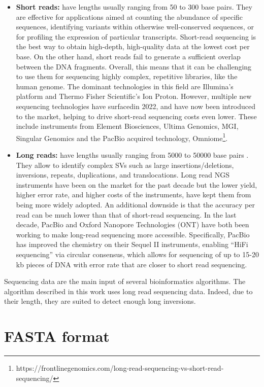 \begin{itemize}
\item \textbf{Short reads: } have lengths usually ranging from 50 to 300 base pairs. They are effective for applications aimed at counting the abundance of specific sequences, identifying variants within otherwise well-conserved sequences, or for profiling the expression of particular transcripts. Short-read sequencing is the best way to obtain high-depth, high-quality data at the lowest cost per base. On the other hand, short reads fail to generate a sufficient overlap between the DNA fragments. Overall, this means that it can be challenging to use them for sequencing highly complex, repetitive libraries, like the human genome. The dominant technologies in this field are Illumina’s platform and Thermo Fisher Scientific’s Ion Proton. However, multiple new sequencing technologies have surfacedin 2022, and have now been introduced to the market, helping to drive short-read sequencing costs even lower. These include instruments from Element Biosciences, Ultima Genomics, MGI, Singular Genomics and the PacBio acquired technology, Omniome\footnote{https://frontlinegenomics.com/long-read-sequencing-vs-short-read-sequencing/}. 
\item \textbf{Long reads: } have lengths usually ranging from 5000 to 50000 base pairs \cite{lee_error_2014}. They allow to identify complex SVs such as large insertions/deletions, inversions, repeats, duplications, and translocations. Long read NGS instruments have been on the market for the past decade but the lower yield, higher error rate, and higher costs of the instruments, have kept them from being more widely adopted. An additional downside is that the accuracy per read can be much lower than that of short-read sequencing. In the last decade, PacBio and Oxford Nanopore Technologies (ONT) have both been working to make long-read sequencing more accessible. Specifically, PacBio has improved the chemistry on their Sequel II instruments, enabling “HiFi sequencing” via circular consensus, which allows for sequencing of up to 15-20 kb pieces of DNA with error rate that are closer to short read sequencing.

\end{itemize}

Sequencing data are the main input of several bioinformatics algorithms. The algorithm described in this work uses long read sequencing data. Indeed, due to their length, they are suited to detect enough long inversions. 

\section{FASTA format}

